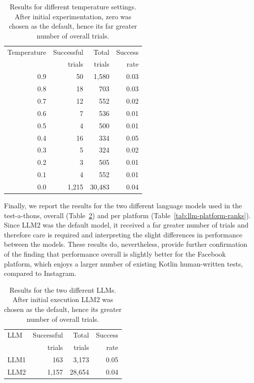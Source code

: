 \documentclass[sigconf,screen]{acmart}
\begin{document}
\begin{table}
\begin{tabular}{||r | r | r | r ||} 
 \hline
Temperature & Successful & Total  & Success \\
            & trials     & trials & rate    \\
\hline 
0.9	        & 50	     & 1,580  & 0.03    \\
0.8	        & 18    	 & 703    &	0.03    \\
0.7	        & 12 	     & 552    & 0.02    \\
0.6	        & 7	         & 536    & 0.01    \\
0.5	        & 4	         & 500    &	0.01    \\
0.4	        & 16	     & 334    &	0.05    \\
0.3	        & 5	         & 324 	  & 0.02    \\
0.2	        & 3	         & 505	  & 0.01    \\
0.1	        & 4	         & 552	  & 0.01    \\
0.0	        & 1,215	     & 30,483 & 0.04    \\	
\hline
\end{tabular}
\caption{Results for different temperature settings. 
After initial experimentation, zero was chosen as the default, hence its far greater number of overall trials. }
\label{tab:temp-ranks}
\end{table}





Finally, we report the results for the two different language models used in the test-a-thons, overall (Table~\ref{tab:llm-ranks}) and per platform (Table~\ref{tab:llm-platform-ranks}).
Since LLM2 was the default model, it received a far greater number of trials and therefore care is required and interpreting the slight differences in performance between the models.
These results do, nevertheless, provide further confirmation of the finding that performance overall is slightly better for the Facebook platform, which enjoys a larger number of existing Kotlin human-written tests, compared to Instagram.



\begin{table}
\begin{tabular}{||l |  r | r | r ||} 
 \hline
LLM           & Successful & Total  & Success \\
              & trials     & trials & rate    \\
\hline              
LLM1         & 163	     & 3,173  &	0.05      \\
LLM2  & 1,157	 & 28,654 & 0.04      \\
 \hline
\end{tabular}
\caption{Results for the two different LLMs. After initial execution LLM2 was chosen as the default, hence its greater number of overall trials. }
\label{tab:llm-ranks}
\end{table}
\end{document}
